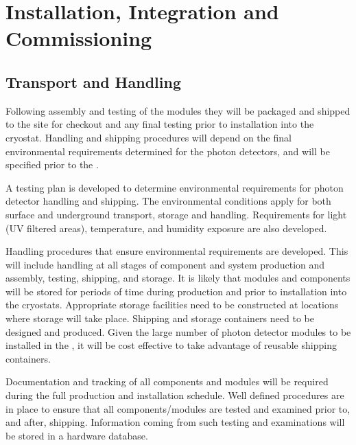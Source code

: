 \section{Installation, Integration and Commissioning}
\label{sec:fdsp-pd-install}


\subsection{Transport and Handling}
\label{sec:fdsp-pd-install-transport}


Following assembly and testing of the  modules they will be packaged and shipped to the  site for checkout and any final testing prior to installation into the cryostat. Handling and shipping procedures will depend on the final environmental requirements determined for the photon detectors, and will be specified prior to the .

A testing plan is developed to determine environmental requirements for photon detector handling and shipping. The environmental conditions apply for both surface and underground transport, storage and handling. Requirements for light (UV filtered areas), temperature, and humidity exposure are also developed.

Handling procedures that ensure environmental requirements are developed. This will include handling at all stages of component and system production and assembly, testing, shipping, and storage. It is likely that  modules and components will be stored for periods of time during production and prior to installation into the  cryostats. Appropriate storage facilities need to be constructed at locations where storage will take place. Shipping and storage containers need to be designed and produced. Given the large number of photon detector modules to be installed in the , it will be cost effective to take advantage of reusable shipping containers.

Documentation and tracking of all components and  modules will be required during the full production and installation schedule. Well defined procedures are in place to ensure that all components/modules are tested and examined prior to, and after, shipping. Information coming from such testing and examinations will be stored in a hardware database.

